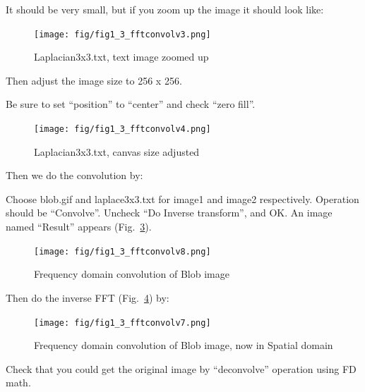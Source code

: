 \begin{indentexercise}{1}

It should be very small, but if you zoom up the image it should look like:

\begin{figure}[htbp]
\begin{center}
\texttt{[image: fig/fig1\_3\_fftconvolv3.png]}
\caption{ Laplacian3x3.txt, text image zoomed up}
\label{fig:fftconv3}
\end{center}
\end{figure}

Then adjust the image size to 256 x 256. 


Be sure to set ``position'' to ``center'' and check ``zero fill''.

\begin{figure}[htbp]
\begin{center}
\texttt{[image: fig/fig1\_3\_fftconvolv4.png]}
\caption{ Laplacian3x3.txt, canvas size adjusted}
\label{fig:fftconv4}
\end{center}
\end{figure}

Then we do the convolution by:


Choose blob.gif and laplace3x3.txt for image1 and image2 respectively. 
Operation should be ``Convolve''. Uncheck ``Do Inverse transform'', and OK.
An image named ``Result'' appears (Fig.~\ref{fig:fftconv8}). 

\begin{figure}[htbp]
\begin{center}
\texttt{[image: fig/fig1\_3\_fftconvolv8.png]}
\caption{Frequency domain convolution of Blob image}
\label{fig:fftconv8}
\end{center}
\end{figure}

Then do the inverse FFT (Fig.~\ref{fig:fftconv7}) by:


\begin{figure}[htbp]
\begin{center}
\texttt{[image: fig/fig1\_3\_fftconvolv7.png]}
\caption{Frequency domain convolution of Blob image, now in Spatial domain}
\label{fig:fftconv7}
\end{center}
\end{figure}

Check that you could get the original image by ``deconvolve'' operation using
FD math.
\end{indentexercise}

